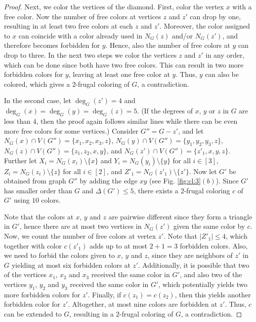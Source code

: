 \documentclass[10pt,a4paper]{article}
\begin{document}
\begin{proof}
Next, we color the vertices of the diamond. First, color the vertex $x$ with a free color. Now the number of free colors at vertices $z$ and $z'$ can drop by one, resulting in at least two free colors at each $z$ and $z'$. Moreover, the color assigned to $x$ can coincide with a color already used in $N_G(z)$ and/or $N_G(z')$, and therefore becomes forbidden for $y$. Hence, also the number of free colors at $y$ can drop to three. In the next two steps we color the vertices $z$ and $z'$ in any order, which can be done since both have two free colors. This can result in two more forbidden colors for $y$, leaving at least one free color at $y$. Thus, $y$ can also be colored, which gives a $2$-frugal coloring of $G$, a contradiction.

\medskip

In the second case, let $\deg_G(z')=4$ and $\deg_G(x)=\deg_G(y)=\deg_G(z)=5$. (If the degrees of $x$, $y$ or $z$ in $G$ are less than $4$, then the proof again follows similar lines while there can be even more free colors for some vertices.) Consider $G''=G-z'$, and let $N_G(x) \cap V(G'')=\{x_1,x_2,x_3,z\}$, $N_G(y) \cap V(G'')=\{y_1,y_2,y_3,z\}$, $N_G(z) \cap V(G'')=\{z_1,z_2,x,y\}$, and $N_G(z') \cap V(G'')=\{z'_1,x,y,z\}$. Further let $X_i=N_G(x_i)\setminus \{x\}$ and $Y_i=N_G(y_i)\setminus \{y\}$ for all $i\in[3]$, $Z_i=N_G(z_i)\setminus \{z\}$ for all $i \in [2]$, and $Z'_1=N_G(z'_1)\setminus \{z'\}$. Now let $G'$ be obtained from graph $G''$ by adding the edge  $xy$ (see Fig. \ref{fig:cl:3}$(b)$). 
Since $G'$ has smaller order than $G$ and $\Delta(G')\le 5$, there exists a $2$-frugal coloring $c$ of $G'$ using $10$ colors.

Note that the colors at $x$, $y$ and $z$ are pairwise different since they form a triangle in $G'$, hence there are at most two vertices in $N_G(z')$ given the same color by $c$. 
Now, we count the number of free colors at vertex $z'$.
Note that $|Z'_1| \le 4$, which together with color $c(z'_1)$ adds up to at most $2+1=3$ forbidden colors. Also, we need to forbid the colors given to $x$, $y$ and $z$, since they are neighbors of $z'$ in $G$ yielding at most six forbidden colors at $z'$. Additionally, it is possible that two of the vertices $x_1$, $x_2$ and $x_3$ received the same color in $G'$, and also two of the vertices $y_1$, $y_2$ and $y_3$ received the same color in $G'$, which potentially yields two more forbidden colors for $z'$. Finally, if $c(z_1)=c(z_2)$, then this yields another forbidden color for $z'$. Altogether, at most nine colors are forbidden at $z'$. Thus, $c$ can be extended to $G$, resulting in a $2$-frugal coloring of $G$, a contradiction.  
\end{proof}
\end{document}
